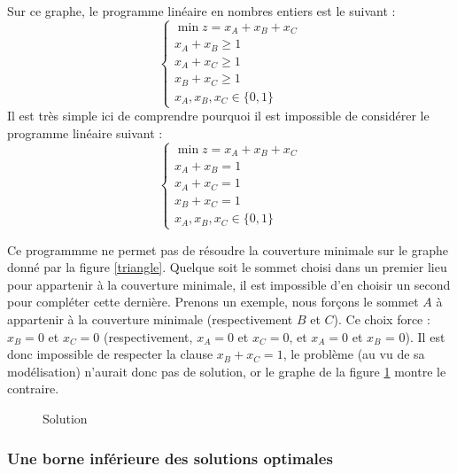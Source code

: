 Sur ce graphe, le programme linéaire en nombres entiers est le suivant :$$
\left \{ \begin{array}{l}
		\min z = x_A + x_B + x_C\\
		x_A + x_B \geq 1 \\
		x_A + x_C \geq 1 \\
		x_B + x_C \geq 1 \\
		x_A, x_B, x_C \in \{0, 1\}
	\end{array} \right .
	$$
Il est très simple ici de comprendre pourquoi il est impossible de considérer le programme linéaire
suivant :$$
\left \{ \begin{array}{l}
		\min z = x_A + x_B + x_C\\
		x_A + x_B = 1 \\
		x_A + x_C = 1 \\
		x_B + x_C = 1 \\
		x_A, x_B, x_C \in \{0, 1\}
	\end{array} \right .
	$$

Ce programmme ne permet pas de résoudre la couverture minimale sur le graphe donné par la figure
\ref{triangle}. Quelque soit le sommet choisi dans un premier lieu pour appartenir à la couverture
minimale, il est impossible d'en choisir un second pour compléter cette dernière. Prenons un
exemple, nous forçons le sommet $A$ à appartenir à la couverture minimale (respectivement $B$ et
$C$). Ce choix force : $x_B = 0$ et $x_C = 0$ (respectivement, $x_A = 0$ et $x_C = 0$, et $x_A = 0$
et $x_B$ = 0). Il est donc impossible de respecter la clause $x_B + x_C = 1$, le problème (au vu de
sa modélisation) n'aurait donc pas de solution, or le graphe de la figure \ref{trisol} montre le
contraire.

\begin{figure}
	\begin{center}
	\end{center}
	\label{trisol}
	\caption{Solution}
\end{figure}

\subsubsection{Une borne inférieure des solutions optimales}

